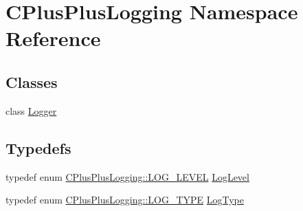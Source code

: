 \hypertarget{namespace_c_plus_plus_logging}{}\section{C\+Plus\+Plus\+Logging Namespace Reference}
\label{namespace_c_plus_plus_logging}
\subsection*{Classes}
\begin{DoxyCompactItemize}
\item 
class \mbox{\hyperlink{class_c_plus_plus_logging_1_1_logger}{Logger}}
\end{DoxyCompactItemize}
\subsection*{Typedefs}
\begin{DoxyCompactItemize}
\item 
typedef enum \mbox{\hyperlink{namespace_c_plus_plus_logging_a446fbaa84d9267b4029b9a521fe842f7}{C\+Plus\+Plus\+Logging\+::\+L\+O\+G\+\_\+\+L\+E\+V\+EL}} \mbox{\hyperlink{namespace_c_plus_plus_logging_af665d4fd4cbfd995a475e01ee59870ac}{Log\+Level}}
\item 
typedef enum \mbox{\hyperlink{namespace_c_plus_plus_logging_a41792ca32aae5ea9a56c7c7578251a76}{C\+Plus\+Plus\+Logging\+::\+L\+O\+G\+\_\+\+T\+Y\+PE}} \mbox{\hyperlink{namespace_c_plus_plus_logging_a4dae38037c368f31976e9db62903ac0d}{Log\+Type}}
\end{DoxyCompactItemize}
